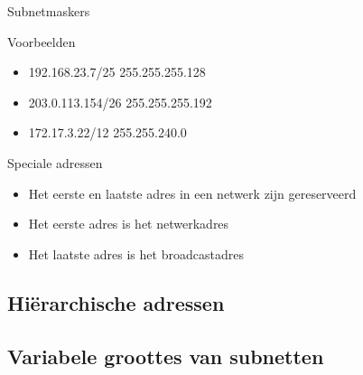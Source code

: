 \begin{frame}{Subnetmaskers}
\begin{exampleblock}{Voorbeelden}
\begin{itemize}
\item<1-> 192.168.23.7/25 \hfill 255.255.255.128 \hspace*{.3\textwidth}\null
\item<2-> 203.0.113.154/26 \hfill 255.255.255.192 \hspace*{.3\textwidth}\null
\item<3-> 172.17.3.22/12 \hfill 255.255.240.0 \hspace*{.3\textwidth}\null
\end{itemize}
\end{exampleblock}
\end{frame}



\begin{frame}{Speciale adressen}
\begin{itemize}
\item Het eerste en laatste adres in een netwerk zijn gereserveerd
\item Het eerste adres is het \alert{netwerkadres}
\item Het laatste adres is het \alert{broadcastadres}
\end{itemize}
\end{frame}


\subsection{Hiërarchische adressen}

\begin{frame}
\end{frame}

\subsection{Variabele groottes van subnetten}

\begin{frame}
\end{frame}





